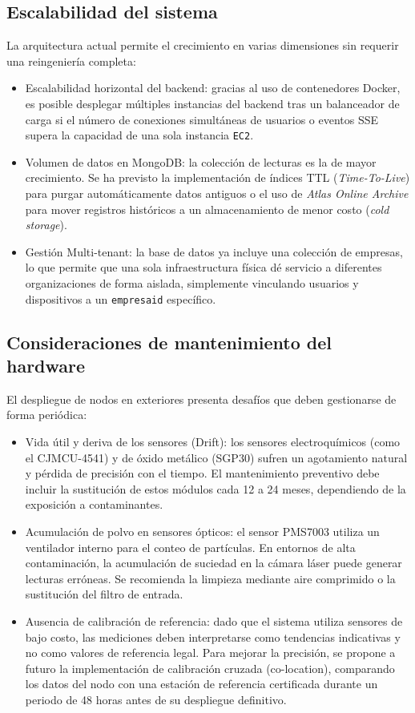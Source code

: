 \subsection{Escalabilidad del sistema}

La arquitectura actual permite el crecimiento en varias dimensiones sin requerir una reingeniería completa:

\begin{itemize}
    \item Escalabilidad horizontal del backend: gracias al uso de contenedores Docker, es posible desplegar múltiples instancias del backend tras un balanceador de carga si el número de conexiones simultáneas de usuarios o eventos SSE supera la capacidad de una sola instancia \texttt{EC2}.
    \item Volumen de datos en MongoDB: la colección de lecturas es la de mayor crecimiento. Se ha previsto la implementación de índices TTL (\textit{Time-To-Live}) para purgar automáticamente datos antiguos o el uso de \textit{Atlas Online Archive} para mover registros históricos a un almacenamiento de menor costo (\textit{cold storage}).
    \item Gestión Multi-tenant: la base de datos ya incluye una colección de empresas, lo que permite que una sola infraestructura física dé servicio a diferentes organizaciones de forma aislada, simplemente vinculando usuarios y dispositivos a un \texttt{empresa\textunderscore id} específico.
\end{itemize}

\subsection{Consideraciones de mantenimiento del hardware}

El despliegue de nodos en exteriores presenta desafíos que deben gestionarse de forma periódica:

\begin{itemize}
    \item Vida útil y deriva de los sensores (Drift): los sensores electroquímicos (como el CJMCU-4541) y de óxido metálico (SGP30) sufren un agotamiento natural y pérdida de precisión con el tiempo. El mantenimiento preventivo debe incluir la sustitución de estos módulos cada 12 a 24 meses, dependiendo de la exposición a contaminantes.
    \item Acumulación de polvo en sensores ópticos: el sensor PMS7003 utiliza un ventilador interno para el conteo de partículas. En entornos de alta contaminación, la acumulación de suciedad en la cámara láser puede generar lecturas erróneas. Se recomienda la limpieza mediante aire comprimido o la sustitución del filtro de entrada.    
    \item Ausencia de calibración de referencia: dado que el sistema utiliza sensores de bajo costo, las mediciones deben interpretarse como tendencias indicativas y no como valores de referencia legal. Para mejorar la precisión, se propone a futuro la implementación de calibración cruzada (co-location), comparando los datos del nodo con una estación de referencia certificada durante un periodo de 48 horas antes de su despliegue definitivo.
\end{itemize}

